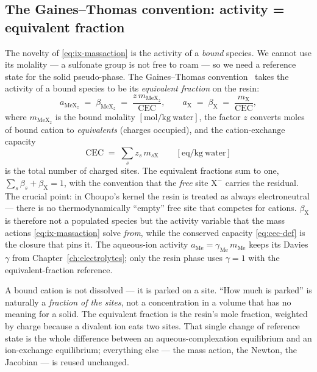 \documentclass[11pt,a4paper]{article}
\begin{document}
\subsection{The Gaines--Thomas convention: activity = equivalent
fraction}

The novelty of \eqref{eq:ix-massaction} is the activity of a
\emph{bound} species.  We cannot use its molality --- a sulfonate group
is not free to roam --- so we need a reference state for the solid
pseudo-phase.  The Gaines--Thomas convention~\cite{GainesThomas1953}
takes the activity of a bound species to be its \emph{equivalent
fraction} on the resin:
\begin{equation}
   a_{\mathrm{Me X}_z} \;=\; \beta_{\mathrm{Me X}_z}
   \;=\; \frac{z\,m_{\mathrm{Me X}_z}}{\mathrm{CEC}},
   \qquad
   a_{\mathrm{X}} \;=\; \beta_{\mathrm{X}} \;=\; \frac{m_{\mathrm{X}}}{\mathrm{CEC}},
   \label{eq:gt-beta}
\end{equation}
where $m_{\mathrm{Me X}_z}$ is the bound molality $[\mathrm{mol/kg\
water}]$, the factor $z$ converts moles of bound cation to
\emph{equivalents} (charges occupied), and the cation-exchange capacity
\begin{equation}
   \mathrm{CEC} \;=\; \sum_s z_s\,m_{s\mathrm X}
   \qquad [\mathrm{eq/kg\ water}]
   \label{eq:cec-def}
\end{equation}
is the total number of charged sites.  The equivalent fractions sum to
one, $\sum_s \beta_s + \beta_{\mathrm X} = 1$, with the convention that
the \emph{free} site $\mathrm{X^-}$ carries the residual.  The crucial
point: in Choupo's kernel the resin is treated as always
electroneutral --- there is no thermodynamically ``empty'' free site
that competes for cations.  $\beta_{\mathrm X}$ is therefore not a
populated species but the activity variable that the mass actions
\eqref{eq:ix-massaction} solve \emph{from}, while the conserved capacity
\eqref{eq:cec-def} is the closure that pins it.  The aqueous-ion
activity $a_{\mathrm{Me}}=\gamma_{\mathrm{Me}}\,m_{\mathrm{Me}}$ keeps
its Davies $\gamma$ from Chapter~\ref{ch:electrolytes}; only the resin
phase uses $\gamma=1$ with the equivalent-fraction reference.

\begin{intuition}
A bound cation is not dissolved --- it is parked on a site.  ``How much
is parked'' is naturally a \emph{fraction of the sites}, not a
concentration in a volume that has no meaning for a solid.  The
equivalent fraction is the resin's mole fraction, weighted by charge
because a divalent ion eats two sites.  That single change of reference
state is the whole difference between an aqueous-complexation
equilibrium and an ion-exchange equilibrium; everything else --- the
mass action, the Newton, the Jacobian --- is reused unchanged.
\end{intuition}
\end{document}
